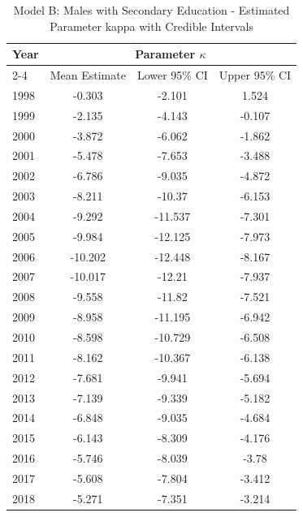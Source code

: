 \begin{landscape}
\begin{table}[htbp]
\centering
\caption{Model B: Males with Secondary Education - Estimated Parameter kappa  with Credible Intervals}
\label{tab:parameters_k15}
\begin{tabular}{@{}lccc@{}}
\toprule
Year & \multicolumn{3}{c}{Parameter \(\kappa\)} \\
\cmidrule(lr){2-4}
      & Mean Estimate & Lower 95\% CI & Upper 95\% CI \\
\midrule
1998 & -0.303 & -2.101 & 1.524 \\
1999 & -2.135 & -4.143 & -0.107 \\
2000 & -3.872 & -6.062 & -1.862 \\
2001 & -5.478 & -7.653 & -3.488 \\
2002 & -6.786 & -9.035 & -4.872 \\
2003 & -8.211 & -10.37 & -6.153 \\
2004 & -9.292 & -11.537 & -7.301 \\
2005 & -9.984 & -12.125 & -7.973 \\
2006 & -10.202 & -12.448 & -8.167 \\
2007 & -10.017 & -12.21 & -7.937 \\
2008 & -9.558 & -11.82 & -7.521 \\
2009 & -8.958 & -11.195 & -6.942 \\
2010 & -8.598 & -10.729 & -6.508 \\
2011 & -8.162 & -10.367 & -6.138 \\
2012 & -7.681 & -9.941 & -5.694 \\
2013 & -7.139 & -9.339 & -5.182 \\
2014 & -6.848 & -9.035 & -4.684 \\
2015 & -6.143 & -8.309 & -4.176 \\
2016 & -5.746 & -8.039 & -3.78 \\
2017 & -5.608 & -7.804 & -3.412 \\
2018 & -5.271 & -7.351 & -3.214 \\
\bottomrule
\end{tabular}
\end{table}
\end{landscape}